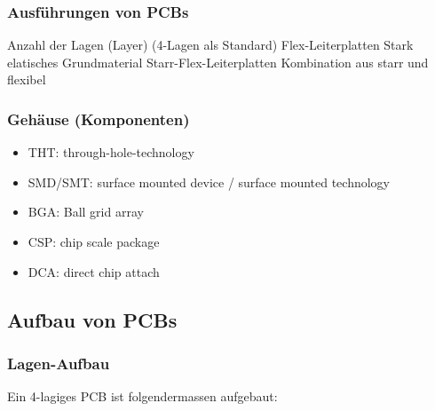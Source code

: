 \vspace{0.2cm}
\begin{minipage}[t]{0.48\columnwidth}
    \subsubsection{Ausführungen von PCBs}

    \begin{outline}
        \1 Anzahl der Lagen (Layer)
            \2  (4-Lagen als Standard)
        \1 Flex-Leiterplatten
            \2 Stark elatisches Grundmaterial
        \1 Starr-Flex-Leiterplatten
            \2 Kombination aus starr und flexibel
    \end{outline}
\end{minipage}
\hfill
\begin{minipage}[t]{0.48\columnwidth}
    \subsubsection{Gehäuse (Komponenten)}

    \begin{itemize}
        \item THT: through-hole-technology
        \item SMD/SMT: surface mounted device / surface mounted technology
        \item BGA: Ball grid array
        \item CSP: chip scale package
        \item DCA: direct chip attach
     \end{itemize}
\end{minipage}


\subsection{Aufbau von PCBs}

\subsubsection{Lagen-Aufbau}

Ein 4-lagiges PCB ist folgendermassen aufgebaut:

